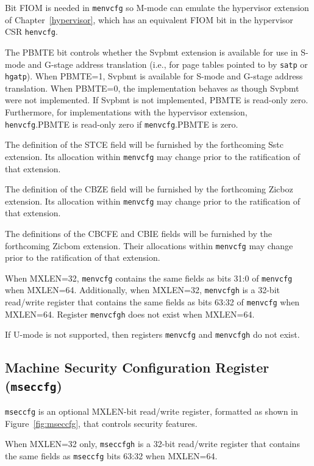 \begin{commentary}
Bit FIOM is needed in {\tt menvcfg} so M-mode can emulate the
hypervisor extension of Chapter~\ref{hypervisor}, which has an
equivalent FIOM bit in the hypervisor CSR {\tt henvcfg}.
\end{commentary}

The PBMTE bit controls whether the Svpbmt extension is available for use in
S-mode and G-stage address translation (i.e., for page tables pointed to by
{\tt satp} or {\tt hgatp}).
When PBMTE=1, Svpbmt is available for S-mode and G-stage address translation.
When PBMTE=0, the implementation behaves as though Svpbmt were not implemented.
If Svpbmt is not implemented, PBMTE is read-only zero.
Furthermore, for implementations with the hypervisor extension,
{\tt henvcfg}.PBMTE is read-only zero if {\tt menvcfg}.PBMTE is zero.

The definition of the STCE field will be furnished by the
forthcoming Sstc extension.
Its allocation within {\tt menvcfg} may change prior to the ratification
of that extension.

The definition of the CBZE field will be furnished by the
forthcoming Zicboz extension.
Its allocation within {\tt menvcfg} may change prior to the ratification
of that extension.

The definitions of the CBCFE and CBIE fields will be furnished by the
forthcoming Zicbom extension.
Their allocations within {\tt menvcfg} may change prior to the ratification
of that extension.

When MXLEN=32, {\tt menvcfg} contains the same fields as bits 31:0
of {\tt menvcfg} when MXLEN=64.
Additionally, when MXLEN=32, {\tt menvcfgh} is a 32-bit read/write register that
contains the same fields as bits 63:32 of {\tt menvcfg} when
MXLEN=64.
Register {\tt menvcfgh} does not exist when MXLEN=64.

If U-mode is not supported, then registers {\tt menvcfg} and {\tt menvcfgh} do
not exist.

\subsection{Machine Security Configuration Register ({\tt mseccfg})}
\label{sec:mseccfg}

{\tt mseccfg} is an optional MXLEN-bit read/write register, formatted as shown
in Figure~\ref{fig:mseccfg}, that controls security features.

When MXLEN=32 only, {\tt mseccfgh} is a 32-bit read/write register that
contains the same fields as {\tt mseccfg} bits 63:32 when MXLEN=64.


